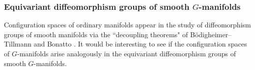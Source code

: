 \documentclass[11pt]{amsart}
\makeatletter
\theoremstyle{definition}
\numberwithin{equation}{subsection} %
\def\r{\mathbb{R}}
\def\z{\mathbb{Z}}
\newcommand{\switchmargin}{
\if@reversemargin
\normalmarginpar
\else
\reversemarginpar
\fi
}
\newcommand{\ChaseNote}[1]
   {\marginpar{\raggedright\smaller \smaller \color{purple}#1}\switchmargin}
\makeatother
\begin{document}
\subsubsection{Equivariant diffeomorphism groups of smooth $G$-manifolds}

Configuration spaces of ordinary manifolds appear in the study of diffeomorphism groups of smooth manifolds via the ``decoupling theorems" of B{\"o}digheimer--Tillmann \cite{BT01} and Bonatto \cite{Bon22}. It would be interesting to see if the configuration spaces of $G$-manifolds arise analogously in the equivariant diffeomorphism groups of smooth $G$-manifolds. 




\end{document}
